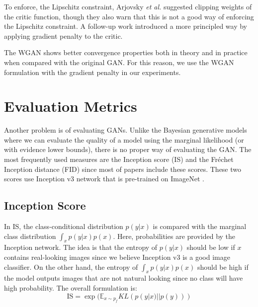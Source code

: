 \documentclass[a4paper,onesided,12pt]{report}
\begin{document}
To enforce, the Lipschitz constraint, Arjovsky \textit{et al.} \cite{arjovsky2017wasserstein} suggested clipping weights of the critic function, though they also warn that this is not a good way of enforcing the Lipschitz constraint. A follow-up work \cite{gulrajani2017improved} introduced a more principled way by applying gradient penalty to the critic.

The WGAN shows better convergence properties both in theory and in practice when compared with the original GAN. For this reason, we use the WGAN formulation with the gradient penalty \cite{gulrajani2017improved} in our experiments.

\section{Evaluation Metrics}
\label{sec:evaluation}

Another problem is of evaluating GANs. Unlike the Bayesian generative models where we can evaluate the quality of a model using the marginal likelihood (or with evidence lower bounds), there is no proper way of evaluating the GAN. The most frequently used measures are the Inception score (IS) \cite{salimans2016improved} and the Fr\'echet Inception distance (FID) \cite{heusel2017gans} since most of papers include these scores. These two scores use Inception v3 network \cite{szegedy2016rethinking} that is pre-trained on ImageNet \cite{deng2009imagenet}.

\subsection{Inception Score}
\label{subsec:is}
In IS, the class-conditional distribution $p(y|x)$ is compared with the marginal class distribution $\int_x p(y|x) p(x)$. Here, probabilities are provided by the Inception network. The idea is that the entropy of $p(y|x)$ should be low if $x$ contains real-looking images since we believe Inception v3 is a good image classifier. On the other hand, the entropy of $\int_x p(y | x) p(x)$ should be high if the model outputs images that are not natural looking since no class will have high probability. The overall formulation is:
\begin{equation}
\label{eq:is}
\text{IS}=\exp (\mathbb{E}_{x \sim p_f} KL (p(y|x) || p(y))) 
\end{equation}
\end{document}
